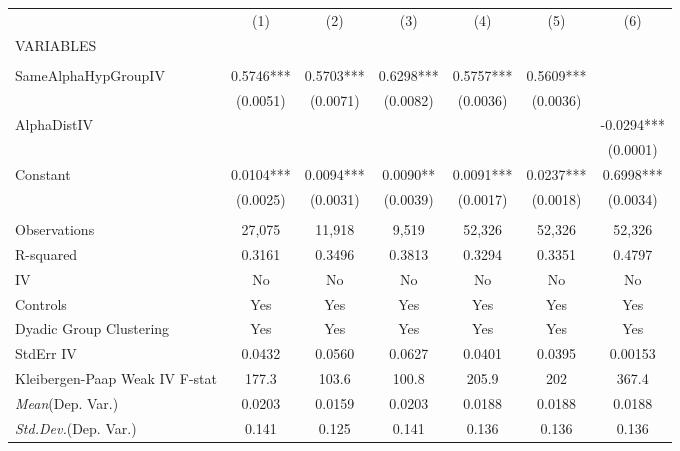 \documentclass[]{article}
\begin{document}
\begin{tabular}{lcccccc} \hline
 & (1) & (2) & (3) & (4) & (5) & (6) \\
VARIABLES &  &  &  &  &  &  \\ \hline
 &  &  &  &  &  &  \\
SameAlphaHypGroupIV & 0.5746*** & 0.5703*** & 0.6298*** & 0.5757*** & 0.5609*** &  \\
 & (0.0051) & (0.0071) & (0.0082) & (0.0036) & (0.0036) &  \\
AlphaDistIV &  &  &  &  &  & -0.0294*** \\
 &  &  &  &  &  & (0.0001) \\
Constant & 0.0104*** & 0.0094*** & 0.0090** & 0.0091*** & 0.0237*** & 0.6998*** \\
 & (0.0025) & (0.0031) & (0.0039) & (0.0017) & (0.0018) & (0.0034) \\
 &  &  &  &  &  &  \\
Observations & 27,075 & 11,918 & 9,519 & 52,326 & 52,326 & 52,326 \\
R-squared & 0.3161 & 0.3496 & 0.3813 & 0.3294 & 0.3351 & 0.4797 \\
IV & No & No & No & No & No & No \\
Controls & Yes & Yes & Yes & Yes & Yes & Yes \\
Dyadic Group Clustering & Yes & Yes & Yes & Yes & Yes & Yes \\
StdErr IV & 0.0432 & 0.0560 & 0.0627 & 0.0401 & 0.0395 & 0.00153 \\
Kleibergen-Paap Weak IV F-stat & 177.3 & 103.6 & 100.8 & 205.9 & 202 & 367.4 \\
\textit{Mean}(Dep. Var.) & 0.0203 & 0.0159 & 0.0203 & 0.0188 & 0.0188 & 0.0188 \\
 \textit{Std.Dev.}(Dep. Var.) & 0.141 & 0.125 & 0.141 & 0.136 & 0.136 & 0.136 \\ \hline
\end{tabular}
\end{document}
